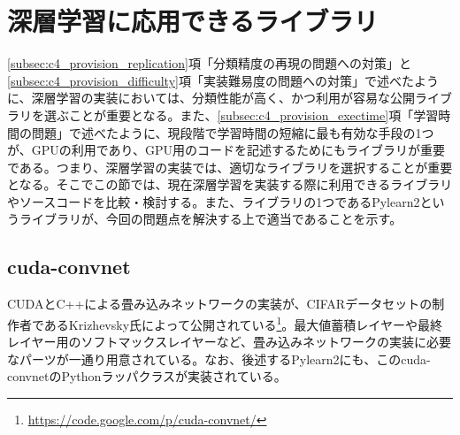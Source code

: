 \section{深層学習に応用できるライブラリ}
\label{sec:c4_deep_library}
\ref{subsec:c4_provision_replication}項「分類精度の再現の問題への対策」と\ref{subsec:c4_provision_difficulty}項「実装難易度の問題への対策」で述べたように、深層学習の実装においては、分類性能が高く、かつ利用が容易な公開ライブラリを選ぶことが重要となる。また、\ref{subsec:c4_provision_exectime}項「学習時間の問題」で述べたように、現段階で学習時間の短縮に最も有効な手段の1つが、GPUの利用であり、GPU用のコードを記述するためにもライブラリが重要である。つまり、深層学習の実装では、適切なライブラリを選択することが重要となる。そこでこの節では、現在深層学習を実装する際に利用できるライブラリやソースコードを比較・検討する。また、ライブラリの1つであるPylearn2というライブラリが、今回の問題点を解決する上で適当であることを示す。


\subsection{cuda-convnet}
CUDAとC++による畳み込みネットワークの実装が、CIFARデータセットの制作者であるKrizhevsky氏によって公開されている\footnote{\url{https://code.google.com/p/cuda-convnet/}}。最大値蓄積レイヤーや最終レイヤー用のソフトマックスレイヤーなど、畳み込みネットワークの実装に必要なパーツが一通り用意されている。なお、後述するPylearn2にも、このcuda-convnetのPythonラッパクラスが実装されている。

